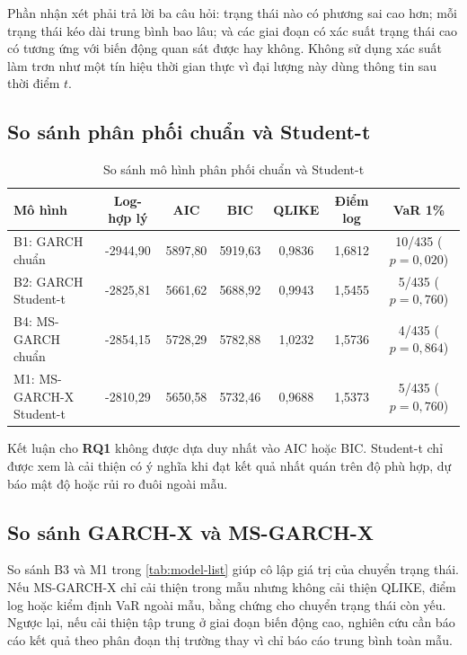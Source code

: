 \documentclass[12pt,a4paper]{article}
\numberwithin{equation}{section}
\newcommand{\RQ}[1]{\textbf{RQ#1}}
\begin{document}
Phần nhận xét phải trả lời ba câu hỏi: trạng thái nào có phương sai cao hơn; mỗi trạng thái kéo dài trung bình bao lâu; và các giai đoạn có xác suất trạng thái cao có tương ứng với biến động quan sát được hay không. Không sử dụng xác suất làm trơn như một tín hiệu thời gian thực vì đại lượng này dùng thông tin sau thời điểm $t$.

\subsection{So sánh phân phối chuẩn và Student-t}\label{subsec:gaussian-t-results}

\begin{table}[H]
\centering
\caption{So sánh mô hình phân phối chuẩn và Student-t}
\label{tab:gaussian-t-template}
\begin{tabularx}{\textwidth}{Y *{6}{C}}
\toprule
\textbf{Mô hình} & \textbf{Log-hợp lý} & \textbf{AIC} & \textbf{BIC} & \textbf{QLIKE} & \textbf{Điểm log} & \textbf{VaR 1\%} \\
\midrule
B1: GARCH chuẩn & -2944{,}90 & 5897{,}80 & 5919{,}63 & 0{,}9836 & 1{,}6812 & 10/435 ($p=0{,}020$) \\
B2: GARCH Student-t & -2825{,}81 & 5661{,}62 & 5688{,}92 & 0{,}9943 & 1{,}5455 & 5/435 ($p=0{,}760$) \\
B4: MS-GARCH chuẩn & -2854{,}15 & 5728{,}29 & 5782{,}88 & 1{,}0232 & 1{,}5736 & 4/435 ($p=0{,}864$) \\
M1: MS-GARCH-X Student-t & -2810{,}29 & 5650{,}58 & 5732{,}46 & 0{,}9688 & 1{,}5373 & 5/435 ($p=0{,}760$) \\
\bottomrule
\end{tabularx}
\end{table}

Kết luận cho \RQ{1} không được dựa duy nhất vào AIC hoặc BIC. Student-t chỉ được xem là cải thiện có ý nghĩa khi đạt kết quả nhất quán trên độ phù hợp, dự báo mật độ hoặc rủi ro đuôi ngoài mẫu.

\subsection{So sánh GARCH-X và MS-GARCH-X}\label{subsec:garchx-msgarchx-results}

So sánh B3 và M1 trong \cref{tab:model-list} giúp cô lập giá trị của chuyển trạng thái. Nếu MS-GARCH-X chỉ cải thiện trong mẫu nhưng không cải thiện QLIKE, điểm log hoặc kiểm định VaR ngoài mẫu, bằng chứng cho chuyển trạng thái còn yếu. Ngược lại, nếu cải thiện tập trung ở giai đoạn biến động cao, nghiên cứu cần báo cáo kết quả theo phân đoạn thị trường thay vì chỉ báo cáo trung bình toàn mẫu.
\end{document}
